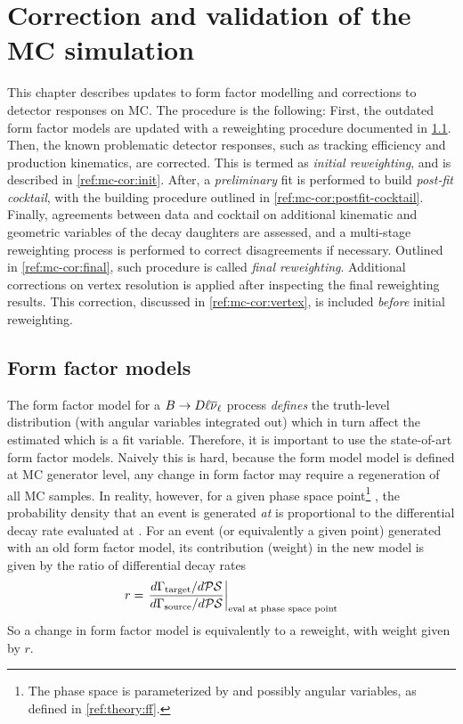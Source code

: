\chapter{Correction and validation of the MC simulation}
\label{ref:mc-cor}

This chapter describes updates to form factor modelling and corrections to
detector responses on MC.
The procedure is the following:
First, the outdated form factor models are updated with a reweighting
procedure documented in \cref{ref:mc-cor:ff}.
Then, the known problematic detector responses,
such as tracking efficiency and \B production kinematics,
are corrected.
This is termed as \emph{initial reweighting}, and is described in
\cref{ref:mc-cor:init}.
After, a \emph{preliminary} fit is performed to build
\emph{post-fit cocktail},
with the building procedure outlined in \cref{ref:mc-cor:postfit-cocktail}.
Finally, agreements between data and cocktail on additional kinematic
and geometric variables of the \B decay daughters are assessed,
and a multi-stage reweighting process is
performed to correct disagreements if necessary.
Outlined in \cref{ref:mc-cor:final}, such procedure is called \emph{final
reweighting}.
Additional corrections on vertex resolution is applied after inspecting the
final reweighting results.
This correction, discussed in \cref{ref:mc-cor:vertex}, is included
\emph{before} initial reweighting.


\section{Form factor models}
\label{ref:mc-cor:ff}

The form factor model for a $B \rightarrow D \ell{\ensuremath{{\overline{\nu}}_\ell}}$ process \emph{defines}
the truth-level \qSq distribution (with angular variables integrated out) which
in turn affect the estimated \qSq which is a fit variable.
Therefore, it is important to use the state-of-art form factor models.
Naively this is hard, because the form model model is defined at MC generator
level, any change in form factor may require a regeneration of all MC samples.
In reality, however, for a given phase space point\footnote{
    The phase space is parameterized by \qSq and possibly angular variables,
    as defined in \cref{ref:theory:ff}.
}  \PSpt, the probability density that an event is generated \emph{at}
\PSpt is proportional to the differential decay rate evaluated at
\PSpt.
For an event (or equivalently a given \PSpt point)
generated with an old form factor model,
its contribution (weight) in the new model is given by the ratio of differential
decay rates
\begin{equation}
    r = \left.
            \frac{d\Gamma_\text{target} / d\mathcal{PS}}{d\Gamma_\text{source} / d\mathcal{PS}}
        \right|_\text{eval at phase space point}
\end{equation}
So a change in form factor model is equivalently to a reweight, with weight given
by $r$.

